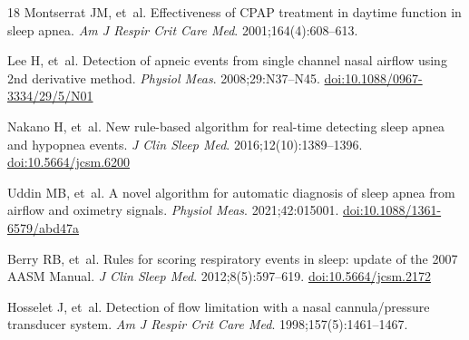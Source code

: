 \documentclass[11pt,a4paper,twocolumn]{article}
\begin{document}
\begin{thebibliography}{18}
Montserrat JM, et~al. Effectiveness of CPAP treatment in daytime function in sleep apnea. \emph{Am J Respir Crit Care Med}. 2001;164(4):608--613.

Lee H, et~al. Detection of apneic events from single channel nasal airflow using 2nd derivative method. \emph{Physiol Meas}. 2008;29:N37--N45. \href{https://doi.org/10.1088/0967-3334/29/5/N01}{doi:10.1088/0967-3334/29/5/N01}

Nakano H, et~al. New rule-based algorithm for real-time detecting sleep apnea and hypopnea events. \emph{J Clin Sleep Med}. 2016;12(10):1389--1396. \href{https://doi.org/10.5664/jcsm.6200}{doi:10.5664/jcsm.6200}

Uddin MB, et~al. A novel algorithm for automatic diagnosis of sleep apnea from airflow and oximetry signals. \emph{Physiol Meas}. 2021;42:015001. \href{https://doi.org/10.1088/1361-6579/abd47a}{doi:10.1088/1361-6579/abd47a}

Berry RB, et~al. Rules for scoring respiratory events in sleep: update of the 2007 AASM Manual. \emph{J Clin Sleep Med}. 2012;8(5):597--619. \href{https://doi.org/10.5664/jcsm.2172}{doi:10.5664/jcsm.2172}

Hosselet J, et~al. Detection of flow limitation with a nasal cannula/pressure transducer system. \emph{Am J Respir Crit Care Med}. 1998;157(5):1461--1467.

\end{thebibliography}
\end{document}
